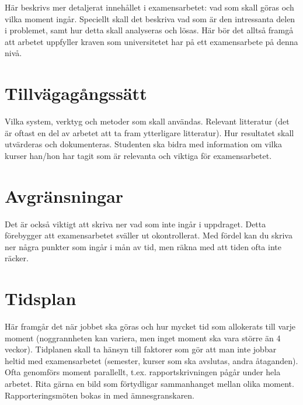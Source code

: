 \documentclass[11pt]{article}
\begin{document}
Här beskrivs mer detaljerat innehållet i examensarbetet: vad som skall göras och vilka moment ingår. Speciellt skall det beskriva vad som är den intressanta delen i problemet, samt hur detta skall analyseras och lösas. Här bör det alltså framgå att arbetet uppfyller kraven som universitetet har på ett examensarbete på denna nivå.

\section{Tillvägagångssätt}

Vilka system, verktyg och metoder som skall användas. Relevant litteratur (det är oftast en del av arbetet att ta fram ytterligare litteratur). Hur resultatet skall utvärderas och dokumenteras. Studenten ska bidra med information om vilka kurser han/hon har tagit som är relevanta och viktiga för examensarbetet.

\section{Avgränsningar}

Det är också viktigt att skriva ner vad som inte ingår i uppdraget. Detta förebygger att examensarbetet sväller ut okontrollerat. Med fördel kan du skriva ner några punkter som ingår i mån av tid, men räkna med att tiden ofta inte räcker.

\section{Tidsplan}

Här framgår det när jobbet ska göras och hur mycket tid som allokerats till varje moment (noggrannheten kan variera, men inget moment ska vara större än 4 veckor). Tidplanen skall ta hänsyn till faktorer som gör att man inte jobbar heltid med examensarbetet (semester, kurser som ska avslutas, andra åtaganden). Ofta genomförs moment parallellt, t.ex. rapportskrivningen pågår under hela arbetet. Rita gärna en bild som förtydligar sammanhanget mellan olika moment. Rapporteringsmöten bokas in med ämnesgranskaren.
\end{document}
